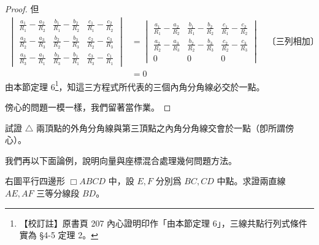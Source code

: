 \begin{proof}
但
\begin{align*}
\begin{vmatrix}
\frac{a_1}{R_1} - \frac{a_2}{R_2} & \frac{b_1}{R_1} - \frac{b_2}{R_2} & \frac{c_1}{R_1} - \frac{c_2}{R_2} \\
\frac{a_2}{R_2} - \frac{a_3}{R_3} & \frac{b_2}{R_2} - \frac{b_3}{R_3} & \frac{c_2}{R_2} - \frac{c_3}{R_3} \\
\frac{a_3}{R_3} - \frac{a_1}{R_1} & \frac{b_3}{R_3} - \frac{b_1}{R_1} & \frac{c_3}{R_3} - \frac{c_1}{R_1}
\end{vmatrix}
&= \begin{vmatrix}
\frac{a_1}{R_1} - \frac{a_2}{R_2} & \frac{b_1}{R_1} - \frac{b_2}{R_2} & \frac{c_1}{R_1} - \frac{c_2}{R_2} \\
\frac{a_2}{R_2} - \frac{a_3}{R_3} & \frac{b_2}{R_2} - \frac{b_3}{R_3} & \frac{c_2}{R_2} - \frac{c_3}{R_3} \\
0 & 0 & 0
\end{vmatrix} \quad \text{〔三列相加〕} \\
&= 0
\end{align*}
由本節定理 6\footnote{\label{note:b3s-ch4-p207-theorem-ref}【校訂註】原書頁 207 內心證明印作「由本節定理 6」，三線共點行列式條件實為 \S 4-5 定理 2。}，知這三方程式所代表的三個內角分角線必交於一點。

傍心的問題一模一樣，我們留著當作業。 \qedhere
\end{proof}

\begin{exercise}[*作業 31]
試證 $\triangle$ 兩頂點的外角分角線與第三頂點之內角分角線交會於一點（卽所謂傍心）。
\end{exercise}

我們再以下面論例，說明向量與座標混合處理幾何問題方法。

\begin{example}[論例 8]
右圖平行四邊形 $\Box ABCD$ 中，設 $E, F$ 分別爲 $BC, CD$ 中點。求證兩直線 $AE, AF$ 三等分線段 $BD$。
\end{example}

